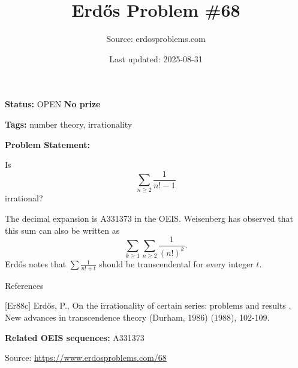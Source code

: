 \documentclass{article}
\title{Erd\H{o}s Problem \#68}
\date{Last updated: 2025-08-31}
\author{Source: erdosproblems.com}
\begin{document}
\maketitle

\noindent\textbf{Status:} OPEN \quad \textbf{No prize}

\noindent\textbf{Tags:} number theory, irrationality

\medskip

\noindent\textbf{Problem Statement:}

Is\[\sum_{n\geq 2}\frac{1}{n!-1}\]irrational?




The decimal expansion is A331373 in the OEIS. Weisenberg has observed that this sum can also be written as\[\sum_{k\geq 1}\sum_{n\geq 2}\frac{1}{(n!)^k}.\]Erd\H{o}s \cite{Er88c} notes that $\sum \frac{1}{n!+t}$ should be transcendental for every integer $t$.




References

[Er88c] Erd\H{o}s, P., On the irrationality of certain series: problems and results . New advances in transcendence theory (Durham, 1986) (1988), 102-109.

\noindent\textbf{Related OEIS sequences:} A331373


\bigskip
\noindent\small{Source: \url{https://www.erdosproblems.com/68}}
\end{document}
